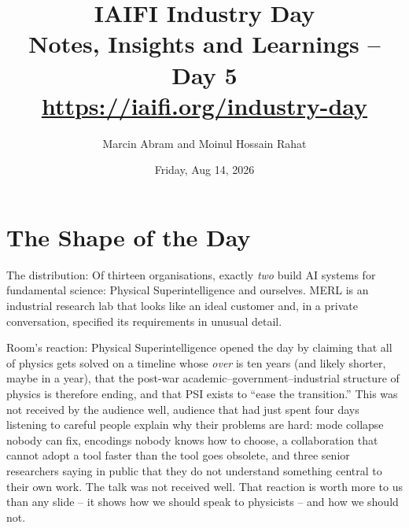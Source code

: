\documentclass[11pt]{article}
\title{IAIFI Industry Day\\[12pt]
\large{Notes, Insights and Learnings -- Day 5}\\[3pt]
\large{\url{https://iaifi.org/industry-day}}}
\author{Marcin Abram and Moinul Hossain Rahat}
\date{Friday, Aug 14, 2026}
\begin{document}
\maketitle

\section*{The Shape of the Day}

The distribution: Of thirteen organisations, exactly \emph{two} build AI systems for fundamental science: Physical Superintelligence and ourselves. MERL is an industrial research lab that looks like an ideal customer and, in a private conversation, specified its requirements in unusual detail.

Room's reaction: Physical Superintelligence opened the day by claiming that all of physics gets solved on a timeline whose \emph{over} is ten years (and likely shorter, maybe in a year), that the post-war academic--government--industrial structure of physics is therefore ending, and that PSI exists to ``ease the transition.'' This was not received by the audience well, audience that had just spent four days listening to careful people explain why their problems are hard: mode collapse nobody can fix, encodings nobody knows how to choose, a collaboration that cannot adopt a tool faster than the tool goes obsolete, and three senior researchers saying in public that they do not understand something central to their own work. The talk was not received well. That reaction is worth more to us than any slide -- it shows how we should speak to physicists -- and how we should not.
\end{document}
